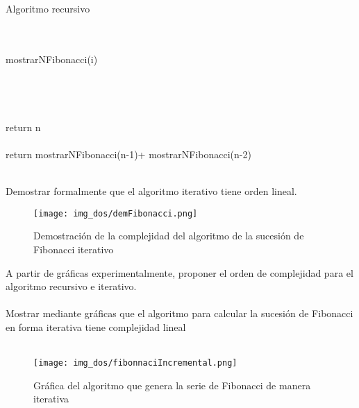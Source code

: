 \documentclass[12pt,twoside]{article}
\begin{document}
\begin{algorithm}[H]
    \caption{Algoritmo recursivo}
      \label{euclides}
      \begin{algorithmic}[1]

		\\
                    \\
                    \State mostrarNFibonacci(i)                             \\
          \EndFor    
          \\
          \EndProcedure
		   \\
\\
                         \\
                          \State return n
                          \\
						 \Else
                         \\
                         \State return mostrarNFibonacci(n-1)+ mostrarNFibonacci(n-2)
                         \\
                         \EndIf
                         \\
          \EndProcedure
           \vspace{5 mm}

      \end{algorithmic}
  \end{algorithm}
\vspace{10 mm}
Demostrar formalmente que el algoritmo iterativo tiene orden lineal.
\vspace{20 mm}
\begin{figure}[H]
\centering
\texttt{[image: img\_dos/demFibonacci.png]}
\caption{Demostración de la complejidad del algoritmo de la sucesión de Fibonacci iterativo}
\label{ejecucionEuclides}
\end{figure}
\vspace{70 mm}
A partir de gráficas experimentalmente, proponer el orden de complejidad para
el algoritmo recursivo e iterativo.
\\\\Mostrar mediante gráficas que el algoritmo para calcular la sucesión de Fibonacci en forma iterativa tiene complejidad lineal\\\\ 
\vspace{2 mm}
\begin{figure}[H]
\centering
\texttt{[image: img\_dos/fibonnaciIncremental.png]}
\caption{Gráfica del algoritmo que genera la serie de Fibonacci de manera iterativa}
\label{ejecucionEuclides}
\end{figure}
\end{document}
